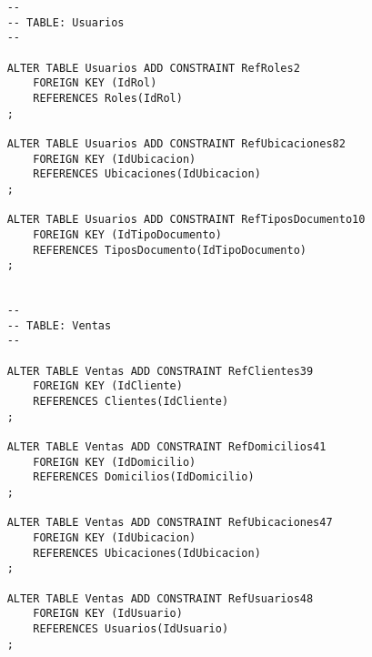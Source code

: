\begin{lstlisting}
	-- 
	-- TABLE: Usuarios 
	--

	ALTER TABLE Usuarios ADD CONSTRAINT RefRoles2 
		FOREIGN KEY (IdRol)
		REFERENCES Roles(IdRol)
	;

	ALTER TABLE Usuarios ADD CONSTRAINT RefUbicaciones82 
		FOREIGN KEY (IdUbicacion)
		REFERENCES Ubicaciones(IdUbicacion)
	;

	ALTER TABLE Usuarios ADD CONSTRAINT RefTiposDocumento10 
		FOREIGN KEY (IdTipoDocumento)
		REFERENCES TiposDocumento(IdTipoDocumento)
	;


	-- 
	-- TABLE: Ventas 
	--

	ALTER TABLE Ventas ADD CONSTRAINT RefClientes39 
		FOREIGN KEY (IdCliente)
		REFERENCES Clientes(IdCliente)
	;

	ALTER TABLE Ventas ADD CONSTRAINT RefDomicilios41 
		FOREIGN KEY (IdDomicilio)
		REFERENCES Domicilios(IdDomicilio)
	;

	ALTER TABLE Ventas ADD CONSTRAINT RefUbicaciones47 
		FOREIGN KEY (IdUbicacion)
		REFERENCES Ubicaciones(IdUbicacion)
	;

	ALTER TABLE Ventas ADD CONSTRAINT RefUsuarios48 
		FOREIGN KEY (IdUsuario)
		REFERENCES Usuarios(IdUsuario)
	;
\end{lstlisting}